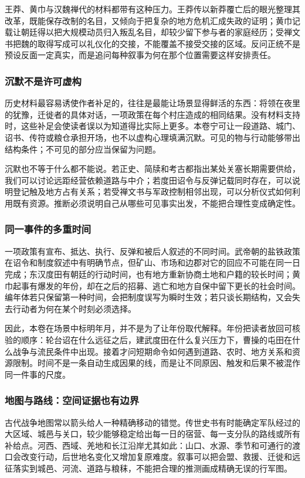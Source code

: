 王莽、黄巾与汉魏禅代的材料都带有这种压力。王莽传以新莽覆亡后的眼光整理其改革，既能保存改制的名目，又倾向于把复杂的地方危机汇成失政的证明；黄巾记载让朝廷得以把大规模动员归入叛乱名目，却较少留下参与者的家庭经历；受禅文书把魏的取得写成可以礼仪化的交接，不能覆盖不接受交接的区域。反问正统不是预设反面一定真实，而是追问每种叙事为何在那个位置需要这样安排责任。

\subsubsection{沉默不是许可虚构}

历史材料最容易诱使作者补足的，往往是最能让场景显得鲜活的东西：将领在夜里的犹豫，迁徙者的具体对话，一项政策在每个村庄造成的相同结果。没有材料支持时，这些补足会使读者误以为知道得比实际上更多。本卷宁可让一段道路、城门、诏书、传符或粮仓承担开场，也不以虚构心理填满沉默。可见的物与行动能够带出结构条件；不可见的部分应当保留为问题。

沉默也不等于什么都不能说。若正史、简牍和考古都指出某处关塞长期需要供给，我们可以讨论远距经营依赖道路与中介；若度田诏令与反弹记载同时存在，可以说明登记触及地方占有关系；若受禅文书与军政控制相邻出现，可以分析仪式如何利用既有资源。推断必须说明自己从哪些可见事实出发，不能把合理性变成确定性。

\subsubsection{同一事件的多重时间}

一项政策有宣布、抵达、执行、反弹和被后人叙述的不同时间。武帝朝的盐铁政策在诏令和制度叙述中有明确节点，但矿山、市场和边郡对它的回应不可能在同一日完成；东汉度田有朝廷的行动时间，也有地方重新协商土地和户籍的较长时间；黄巾起事有爆发的年份，却在之后的招募、逃亡和地方自保中留下更长的社会时间。编年体若只保留第一种时间，会把制度误写为瞬时生效；若只谈长期结构，又会失去行动者为何在某个时刻必须选择。

因此，本卷在场景中标明年月，并不是为了让年份取代解释。年份把读者放回可核验的顺序：轮台诏在什么远征之后，建武度田在什么复兴压力下，曹操的屯田在什么战争与流民条件中出现。接着才问短期命令如何遇到道路、农时、地方关系和资源限制。时间不是一条自动生成因果的线，而是让不同原因、触发和后果不被混作同一件事的尺度。

\subsubsection{地图与路线：空间证据也有边界}

古代战争地图常以箭头给人一种精确移动的错觉。传世史书有时能确定军队经过的大区域、城邑与关口，较少能够稳定给出每一日的宿营、每一支分队的路线或所有补给点。河西、西域、羌地和长江沿岸尤其如此：山口、水源、季节和可通行的渡口会改变行动，后世地名变化又增加复原难度。叙事可以把会盟、救援、迁徙和远征落实到城邑、河流、道路与粮秣，不能把合理的推测画成精确无误的行军图。

